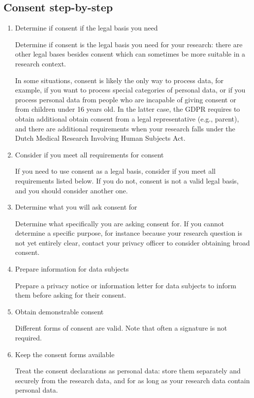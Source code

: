 \documentclass[
]{book}
\begin{document}
\hypertarget{consent-step-by-step}{%
\subsection{Consent step-by-step}\label{consent-step-by-step}}

\begin{enumerate}
\def\labelenumi{\arabic{enumi}.}
\item
  Determine if consent if the legal basis you need

  Determine if consent is the legal basis you need for your
  research: there are other legal bases besides consent which can sometimes be
  more suitable in a research context.

  In some situations, consent is likely the only way to process data, for
  example, if you want to process
  special categories of personal data,
  or if you process personal data from people who are incapable of giving consent
  or from children under 16 years old. In the latter
  case, the GDPR requires to obtain additional obtain consent from a legal
  representative (e.g., parent), and there are additional requirements when your
  research falls under the Dutch
  Medical Research Involving Human Subjects Act.
\item
  Consider if you meet all requirements for consent

  If you need to use consent as a legal basis, consider if you meet
  all requirements listed below. If you do not,
  consent is not a valid legal basis, and you should consider another one.
\item
  Determine what you will ask consent for

  Determine what specifically you are asking consent for. If you cannot
  determine a specific purpose, for instance because your research question is
  not yet entirely clear, contact
  your privacy officer
  to consider obtaining broad consent.
\item
  Prepare information for data subjects

  Prepare a
  privacy notice or information letter
  for data subjects to inform them before asking for their consent.
\item
  Obtain demonstrable consent

  Different forms of consent are valid. Note
  that often a signature is not required.
\item
  Keep the consent forms available

  Treat the consent declarations as personal data:
  store them separately and securely from the
  research data, and for as long as your research data contain personal data.
\end{enumerate}
\end{document}
